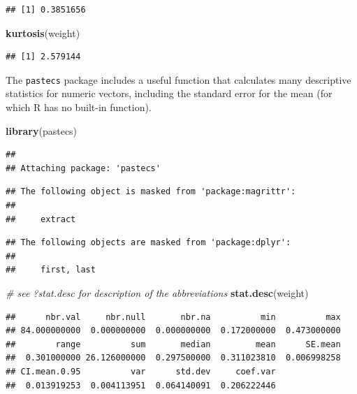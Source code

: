 \documentclass[]{book}
\newenvironment{Shaded}{\begin{snugshade}}{\end{snugshade}}
\newcommand{\CommentTok}[1]{\textcolor[rgb]{0.56,0.35,0.01}{\textit{#1}}}
\newcommand{\KeywordTok}[1]{\textcolor[rgb]{0.13,0.29,0.53}{\textbf{#1}}}
\newcommand{\NormalTok}[1]{#1}
\begin{document}
\begin{verbatim}
## [1] 0.3851656
\end{verbatim}

\begin{Shaded}
\begin{Highlighting}[]
\KeywordTok{kurtosis}\NormalTok{(weight)}
\end{Highlighting}
\end{Shaded}

\begin{verbatim}
## [1] 2.579144
\end{verbatim}

The \texttt{pastecs} package includes a useful function that calculates many descriptive statistics for numeric vectors, including the standard error for the mean (for which R has no built-in function).

\begin{Shaded}
\begin{Highlighting}[]
\KeywordTok{library}\NormalTok{(pastecs)}
\end{Highlighting}
\end{Shaded}

\begin{verbatim}
## 
## Attaching package: 'pastecs'
\end{verbatim}

\begin{verbatim}
## The following object is masked from 'package:magrittr':
## 
##     extract
\end{verbatim}

\begin{verbatim}
## The following objects are masked from 'package:dplyr':
## 
##     first, last
\end{verbatim}

\begin{Shaded}
\begin{Highlighting}[]
\CommentTok{# see ?stat.desc for description of the abbreviations}
\KeywordTok{stat.desc}\NormalTok{(weight)}
\end{Highlighting}
\end{Shaded}

\begin{verbatim}
##      nbr.val     nbr.null       nbr.na          min          max 
## 84.000000000  0.000000000  0.000000000  0.172000000  0.473000000 
##        range          sum       median         mean      SE.mean 
##  0.301000000 26.126000000  0.297500000  0.311023810  0.006998258 
## CI.mean.0.95          var      std.dev     coef.var 
##  0.013919253  0.004113951  0.064140091  0.206222446
\end{verbatim}
\end{document}
